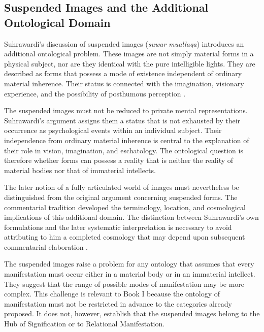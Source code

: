 \subsection{Suspended Images and the Additional Ontological Domain}
\label{sec:ch08-s14-ss13}

\label{para:VS.B01.P01.C08.S14.SS13.P001}

Suhrawardi's discussion of suspended images
(\textit{suwar muallaqa}) introduces an
additional ontological problem. These
images are not simply material forms
in a physical subject, nor are they
identical with the pure intelligible
lights. They are described as forms
that possess a mode of existence
independent of ordinary material
inherence. Their status is connected
with the imagination, visionary
experience, and the possibility
of posthumous perception
\citep[Part II, §§244--259]{SuhrawardiPhilosophyIllumination,MarcotteSuhrawardiSEP2019}.

\label{para:VS.B01.P01.C08.S14.SS13.P002}

The suspended images must not be reduced
to private mental representations.
Suhrawardi's argument assigns them
a status that is not exhausted by
their occurrence as psychological
events within an individual subject.
Their independence from ordinary
material inherence is central to
the explanation of their role in
vision, imagination, and eschatology.
The ontological question is therefore
whether forms can possess a reality
that is neither the reality of
material bodies nor that of
immaterial intellects.

\label{para:VS.B01.P01.C08.S14.SS13.P003}

The later notion of a fully articulated
world of images must nevertheless
be distinguished from the original
argument concerning suspended forms.
The commentarial tradition developed
the terminology, location, and
cosmological implications of this
additional domain. The distinction
between Suhrawardi's own formulations
and the later systematic interpretation
is necessary to avoid attributing
to him a completed cosmology that
may depend upon subsequent
commentarial elaboration
\citep{VanLitWorldImage2017}.

\label{para:VS.B01.P01.C08.S14.SS13.P004}

The suspended images raise a problem
for any ontology that assumes that
every manifestation must occur
either in a material body or in
an immaterial intellect. They
suggest that the range of possible
modes of manifestation may be
more complex. This challenge is
relevant to Book I because the
ontology of manifestation must
not be restricted in advance to
the categories already proposed.
It does not, however, establish
that the suspended images belong
to the Hub of Signification or
to Relational Manifestation.

